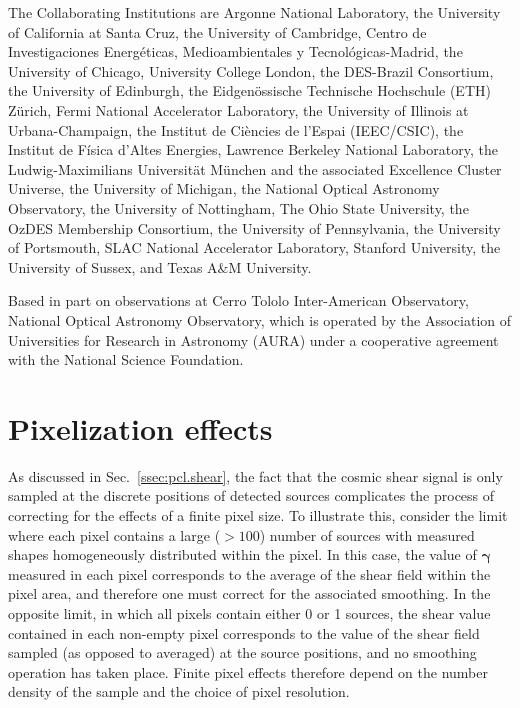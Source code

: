 \documentclass[a4paper,11pt]{article}
\newcommand{\shear}{\boldsymbol{\gamma}}
\begin{document}
    The Collaborating Institutions are Argonne National Laboratory, the University of California at Santa Cruz, the University of Cambridge, Centro de Investigaciones Energ{\'e}ticas, Medioambientales y Tecnol{\'o}gicas-Madrid, the University of Chicago, University College London, the DES-Brazil Consortium, the University of Edinburgh, the Eidgen{\"o}ssische Technische Hochschule (ETH) Z{\"u}rich,  Fermi National Accelerator Laboratory, the University of Illinois at Urbana-Champaign, the Institut de Ci{\`e}ncies de l'Espai (IEEC/CSIC), the Institut de F{\'i}sica d'Altes Energies, Lawrence Berkeley National Laboratory, the Ludwig-Maximilians Universit{\"a}t M{\"u}nchen and the associated Excellence Cluster Universe, the University of Michigan, the National Optical Astronomy Observatory, the University of Nottingham, The Ohio State University, the OzDES Membership Consortium, the University of Pennsylvania, the University of Portsmouth, SLAC National Accelerator Laboratory, Stanford University, the University of Sussex, and Texas A\&M University.
    
    Based in part on observations at Cerro Tololo Inter-American Observatory, National Optical Astronomy Observatory, which is operated by the Association of Universities for Research in Astronomy (AURA) under a cooperative agreement with the National Science Foundation.


  \appendix
  \section{Pixelization effects}\label{app:pix}

    As discussed in Sec.~\ref{ssec:pcl.shear}, the fact that the cosmic shear signal is only sampled at the discrete positions of detected sources complicates the process of correcting for the effects of a finite pixel size. To illustrate this, consider the limit where each pixel contains a large ($>100$) number of sources with measured shapes homogeneously distributed within the pixel. In this case, the value of $\shear$ measured in each pixel corresponds to the average of the shear field within the pixel area, and therefore one must correct for the associated smoothing. In the opposite limit, in which all pixels contain either 0 or 1 sources, the shear value contained in each non-empty pixel corresponds to the value of the shear field sampled (as opposed to averaged) at the source positions, and no smoothing operation has taken place. Finite pixel effects therefore depend on the number density of the sample and the choice of pixel resolution.
    
\end{document}
